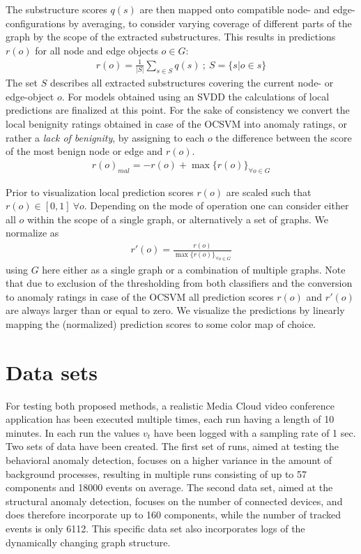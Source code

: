 \documentclass{llncs}
\begin{document}
The substructure scores $q(s)$ are then mapped onto compatible node- and edge-configurations by averaging, to consider varying coverage of different parts of the graph by the scope of the extracted substructures. This results in predictions $r(o)$ for all node and edge objects $o \in G$:
\begin{align}
r(o) = \frac{1}{|S|}\sum\limits_{s\in S} q(s) ~;~ S = \lbrace s | o \in s\rbrace
\end{align}
The set $S$ describes all extracted substructures covering the current node- or edge-object $o$. For models obtained using an SVDD the calculations of local predictions are finalized at this point. For the sake of consistency we convert the local benignity ratings obtained in case of the OCSVM into anomaly ratings, or rather a \emph{lack of benignity}, by assigning to each $o$ the difference between the score of the most benign node or edge and $r(o)$.
\begin{align}
r(o)_{mal} =  - r(o) + \max \lbrace r(o) \rbrace_{\forall o \in G}
\end{align}


Prior to visualization local prediction scores $r(o)$ are scaled such that $r(o) \in [0,1]~\forall o$. Depending on the mode of operation one can consider either all $o$ within the scope of a single graph, or alternatively a set of graphs. We normalize as
\begin{align}
r'(o) = \frac{r(o)}{\max \lbrace r(o) \rbrace_{\forall o \in G}}
\end{align}
using $G$ here either as a single graph or a combination of  multiple graphs. Note that due to exclusion of the thresholding from both classifiers and the conversion to anomaly ratings in case of the OCSVM all prediction scores $r(o)$ and $r'(o)$ are always larger than or equal to zero. We visualize the predictions by linearly mapping the (normalized) prediction scores to some color map of choice.
 

 
\section{Data sets}
\label{sec:datasets}
For testing both proposed methods, a realistic Media Cloud video conference application has been executed multiple times, each run having a length of 10 minutes. In each run the values $v_t$ have been logged with a sampling rate of 1 sec. Two sets of data have been created. The first set of runs, aimed at testing the behavioral anomaly detection, focuses on a higher variance in the amount of background processes, resulting in multiple runs consisting of up to 57 components and 18000 events on average. The second data set, aimed at the structural anomaly detection, focuses on the number of connected devices, and does therefore incorporate up to 160 components, while the number of tracked events is only 6112. This specific data set also incorporates logs of the dynamically changing graph structure.
\end{document}

